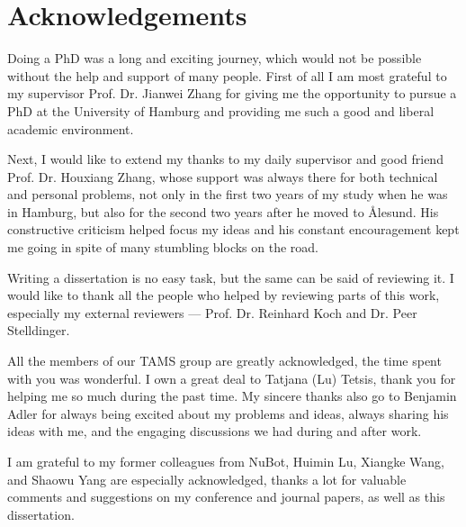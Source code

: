 \chapter*{Acknowledgements}

Doing a PhD was a long and exciting journey, which would not be possible without the help and support of many people. First of all I am most grateful to my supervisor Prof. Dr. Jianwei Zhang for giving me the opportunity to pursue a PhD at the University of Hamburg and providing me such a good and liberal academic environment. 

Next, I would like to extend my thanks to my daily supervisor and good friend Prof. Dr. Houxiang Zhang, whose support was always there for both technical and personal problems, not only in the first two years of my study when he was in Hamburg, but also for the second two years after he moved to {\AA}lesund. His constructive criticism helped focus my ideas and his constant encouragement kept me going in spite of many stumbling blocks on the road.    

Writing a dissertation is no easy task, but the same can be said of reviewing it. I would like to thank all the people who helped by reviewing parts of this work, especially my external reviewers --- Prof. Dr. Reinhard Koch and Dr. Peer Stelldinger. 


All the members of our TAMS group are greatly acknowledged, the time spent with you was wonderful. I own a great deal to Tatjana (Lu) Tetsis, thank you for helping me so much during the past time. My sincere thanks also go to Benjamin Adler for always being excited about my problems and ideas, always sharing his ideas with me, and the engaging discussions we had during and after work. 

I am grateful to my former colleagues from NuBot, Huimin Lu, Xiangke Wang, and Shaowu Yang are especially acknowledged, thanks a lot for valuable comments and suggestions on my conference and journal papers, as well as this dissertation. 


